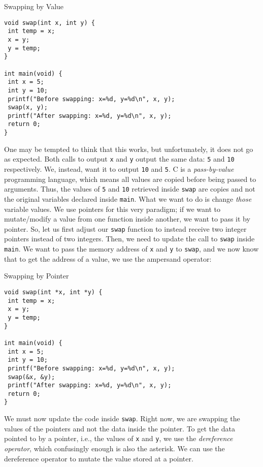 \begin{cl}[main.c]{Swapping by Value}
\begin{lstlisting}[language=MyC]
void swap(int x, int y) {
 int temp = x;
 x = y;
 y = temp;
}

int main(void) {
 int x = 5;
 int y = 10;
 printf("Before swapping: x=%d, y=%d\n", x, y);
 swap(x, y);
 printf("After swapping: x=%d, y=%d\n", x, y);    
 return 0;
}
\end{lstlisting}
\end{cl}

One may be tempted to think that this works, but unfortunately, it does not go as expected. Both calls to output \texttt{x} and \texttt{y} output the same data: \texttt{5} and \texttt{10} respectively. We, instead, want it to output \texttt{10} and \texttt{5}. C is a \textit{pass-by-value} programming language, which means all values are copied before being passed to arguments. Thus, the values of \texttt{5} and \texttt{10} retrieved inside \texttt{swap} are copies and not the original variables declared inside \texttt{main}. What we want to do is change \textit{those} variable values. We use pointers for this very paradigm; if we want to mutate/modify a value from one function inside another, we want to pass it by pointer. So, let us first adjust our \texttt{swap} function to instead receive two integer pointers instead of two integers. Then, we need to update the call to \texttt{swap} inside \texttt{main}. We want to pass the memory address of \texttt{x} and \texttt{y} to \texttt{swap}, and we now know that to get the address of a value, we use the ampersand operator:

\begin{cl}[main.c]{Swapping by Pointer}\begin{lstlisting}[language=MyC]
void swap(int *x, int *y) {
 int temp = x;
 x = y;
 y = temp;
}

int main(void) {
 int x = 5;
 int y = 10;
 printf("Before swapping: x=%d, y=%d\n", x, y);
 swap(&x, &y);
 printf("After swapping: x=%d, y=%d\n", x, y);    
 return 0;
}
\end{lstlisting}\end{cl}

We must now update the code inside \texttt{swap}. Right now, we are swapping the values of the pointers and not the data inside the pointer. To get the data pointed to by a pointer, i.e., the values of \texttt{x} and \texttt{y}, we use the \textit{dereference operator}, which confusingly enough is also the asterisk. We can use the dereference operator to mutate the value stored at a pointer.

